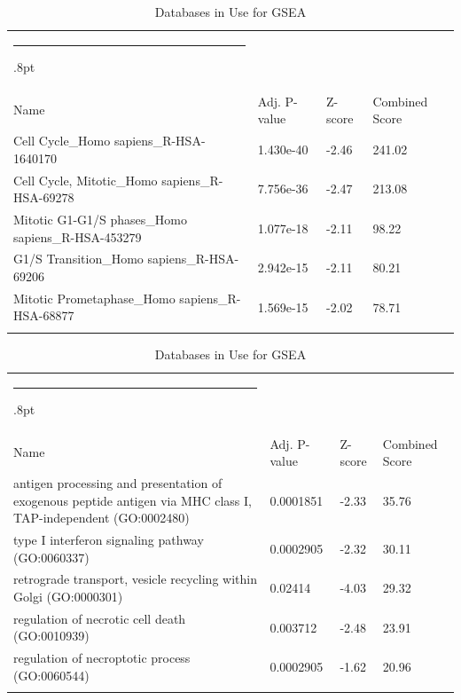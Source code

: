\documentclass[3p,authoryear,preprint,12pt]{elsarticle}
\makeatletter
\def\hlinewd#1{%
  \noalign{\ifnum0=`}\fi\hrule \@height #1%
  \futurelet\reserved@a\@xhline}
\def\tbltoprule{\hlinewd{.8pt}\\[-12pt]}
\def\tblbottomrule{\noalign{\vspace*{6pt}}\hline\noalign{\vspace*{2pt}}}
\def\tblmidrule{\noalign{\vspace*{6pt}}\hline\noalign{\vspace*{2pt}}}
\makeatother
\begin{document}
\begin{table}[!htbp]
	\caption{{Databases in Use for GSEA} }
	\label{tw-de478ae31cc6}
	\def\arraystretch{1}
	\ignorespaces 
	\centering 
	\begin{tabulary}{\linewidth}{p{\dimexpr.65\tabcolsep}p{\dimexpr.15\tabcolsep}p{\dimexpr.1\tabcolsep}p{\dimexpr.1\tabcolsep}}
		\tbltoprule Name & Adj. P-value & Z-score & Combined Score\\
		\tblmidrule
Cell Cycle\_Homo sapiens\_R-HSA-1640170 & 1.430e-40 & -2.46 & 241.02 \\
Cell Cycle, Mitotic\_Homo sapiens\_R-HSA-69278 & 7.756e-36 & -2.47 & 213.08 \\
Mitotic G1-G1/S phases\_Homo sapiens\_R-HSA-453279 & 1.077e-18 & -2.11 & 98.22 \\
G1/S Transition\_Homo sapiens\_R-HSA-69206 & 2.942e-15 & -2.11 & 80.21 \\
Mitotic Prometaphase\_Homo sapiens\_R-HSA-68877 & 1.569e-15 & -2.02 & 78.71 \\
		\tblbottomrule
	\end{tabulary}\par 
\end{table}
\begin{table}[!htbp]
	\caption{{Databases in Use for GSEA} }
	\label{tw-de478ae31cc6}
	\def\arraystretch{1}
	\ignorespaces 
	\centering 
	\begin{tabulary}{\linewidth}{p{\dimexpr.65\tabcolsep}p{\dimexpr.15\tabcolsep}p{\dimexpr.1\tabcolsep}p{\dimexpr.1\tabcolsep}}
		\tbltoprule Name & Adj. P-value & Z-score & Combined Score\\
		\tblmidrule
antigen processing and presentation of exogenous peptide antigen via MHC class I, TAP-independent (GO:0002480) & 0.0001851 & -2.33 & 35.76 \\
type I interferon signaling pathway (GO:0060337) & 0.0002905 & -2.32 & 30.11 \\
retrograde transport, vesicle recycling within Golgi (GO:0000301) & 0.02414 & -4.03 & 29.32 \\
regulation of necrotic cell death (GO:0010939) & 0.003712 & -2.48 & 23.91 \\
regulation of necroptotic process (GO:0060544) & 0.0002905 & -1.62 & 20.96 \\
		\tblbottomrule
	\end{tabulary}\par 
\end{table}
\end{document}
